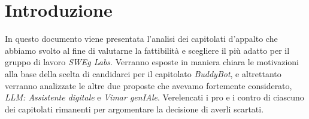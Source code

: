 \section{Introduzione}

In questo documento viene presentata l'analisi dei capitolati d'appalto che abbiamo svolto al fine di valutarne la fattibilità e scegliere il più adatto 
per il gruppo di lavoro \emph{SWEg Labs}. Verranno esposte in maniera chiara le motivazioni alla base della scelta di candidarci per il capitolato 
\emph{BuddyBot}, e altrettanto verranno analizzate le altre due proposte che avevamo fortemente considerato, \emph{LLM: Assistente digitale} e 
\emph{Vimar genIAle}. Verelencati i pro e i contro di ciascuno dei capitolati rimanenti per argomentare la decisione di averli scartati.